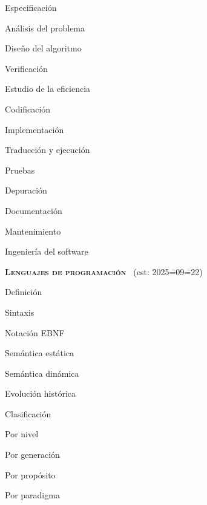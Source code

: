 \begin{longenum}
\begin{longenum}
        \begin{longenum}
            \item Especificación
            \item Análisis del problema
            \item Diseño del algoritmo
            \item Verificación
            \item Estudio de la eficiencia
            \item Codificación
            \begin{longenum}
                \item Implementación
            \end{longenum}
            \item Traducción y ejecución
            \item Pruebas
            \item Depuración
            \item Documentación
            \item Mantenimiento
            \item Ingeniería del software
        \end{longenum}
    \end{longenum}
    \item \textbf{\textsc{Lenguajes de programación}} \ (est: 2025\==09\==22)
    \begin{longenum}
        \item Definición
        \begin{longenum}
            \item Sintaxis
            \begin{longenum}
                \item Notación EBNF
            \end{longenum}
            \item Semántica estática
            \item Semántica dinámica
        \end{longenum}
        \item Evolución histórica \opcional\
        \item Clasificación
        \begin{longenum}
            \item Por nivel
            \item Por generación
            \item Por propósito
            \item Por paradigma

\end{longenum}
\end{longenum}
\end{longenum}
